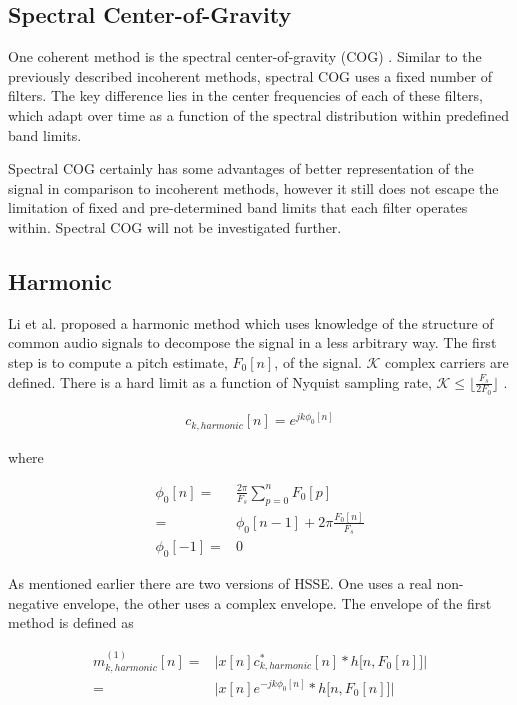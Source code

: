 \documentclass [11pt, proquest,oneside] {ganter_thesis}[2015/03/03]
\begin{document}
\subsection{Spectral Center-of-Gravity}

One coherent method is the spectral center-of-gravity (COG) \cite{clark2009time}.  Similar to the previously described incoherent methods, spectral COG uses a fixed number of filters.  The key difference lies in the center frequencies of each of these filters, which adapt over time as a function of the spectral distribution within predefined band limits.

Spectral COG certainly has some advantages of better representation of the signal in comparison to incoherent methods, however it still does not escape the limitation of fixed and pre-determined band limits that each filter operates within.  Spectral COG will not be investigated further.

\subsection{Harmonic}

Li et al. \cite{li2010harmonic} proposed a harmonic method which uses knowledge of the structure of common audio signals to decompose the signal in a less arbitrary way.  The first step is to compute a pitch estimate, $F_0[n]$, of the signal.  $\mathcal{K}$ complex carriers are defined.  There is a hard limit as a function of Nyquist sampling rate, $\mathcal{K} \leq  \lfloor \frac{F_s}{2F_0} \rfloor$ \cite{clark2010modulation}.

\begin{align}
c_{k,harmonic}[n] = e^{jk\phi_0 [n]}
\end{align}

where 

\begin{align}
\phi_0[n] =& \frac{2\pi}{F_s} \sum_{p=0}^{n} F_0[p] \nonumber \\
=& \phi_0[n - 1] + 2\pi \frac{F_0[n]}{F_s} \\
\phi_0[-1] =& 0 \nonumber
\end{align}

As mentioned earlier there are two versions of HSSE. One uses a real non-negative envelope, the other uses a complex envelope.  The envelope of the first method is defined as

\begin{align}
m^{(1)}_{k,harmonic}[n] =& \Big| x[n] c_{k,harmonic}^*[n] * h\big[n, F_0[n] \big] \Big| \nonumber \\
=& \Big| x[n] e^{-jk\phi_0 [n]} * h\big[n, F_0[n] \big] \Big|
\end{align}
\end{document}
